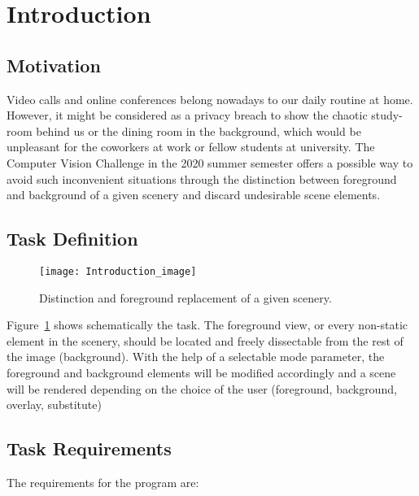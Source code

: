 \section{Introduction}

\subsection{Motivation}
Video calls and online conferences belong nowadays to our daily routine at home. However, it might be considered as a privacy breach to show the chaotic study-room behind us or the dining room in the background, which would be unpleasant for the coworkers at work or fellow students at university. The Computer Vision Challenge in the 2020 summer semester offers a possible way to avoid such inconvenient situations through the distinction between foreground and background of a given scenery and discard undesirable scene elements.
\subsection{Task Definition}

\begin{figure}[!h]
	\centering
	\texttt{[image: Introduction\_image]}
	\caption{Distinction and foreground replacement of a given scenery.}
	\label{fig:Introduction_image}
\end{figure}

Figure~\ref{fig:Introduction_image} shows schematically the task. The foreground view, or every non-static element in the scenery, should be located and freely dissectable from the rest of the image (background). With the help of a selectable mode parameter, the foreground and background elements will be modified accordingly and a scene will be rendered depending on the choice of the user (foreground, background, overlay, substitute)
\\

\subsection{Task Requirements}


The requirements for the program are:

